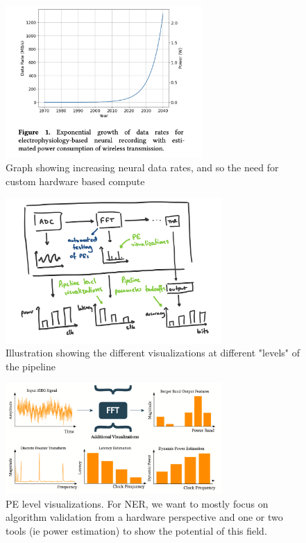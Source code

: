 \documentclass[twocolumn]{article}
\begin{document}
\begin{figure}[htp]
    \centering
    \includegraphics[width=7.5cm]{vis/neural_data_rate.png}
    \caption{Graph showing increasing neural data rates, and so the need for custom hardware based compute}
    \label{fig:comp_graph}
\end{figure}


\begin{figure}[htp]
    \centering
    \includegraphics[width=8.25cm]{vis/vis_hierarchy.jpeg}
    \caption{Illustration showing the different visualizations at different "levels" of the pipeline}
    \label{fig:comp_graph}
\end{figure}

\begin{figure}[htp]
    \centering
    \includegraphics[width=8.25cm]{vis/PE_visualization.png}
    \caption{PE level visualizations. For NER, we want to mostly focus on algorithm validation from a hardware perspective and one or two tools (ie power estimation) to show the potential of this field.}
    \label{fig:comp_graph}
\end{figure}
\end{document}
